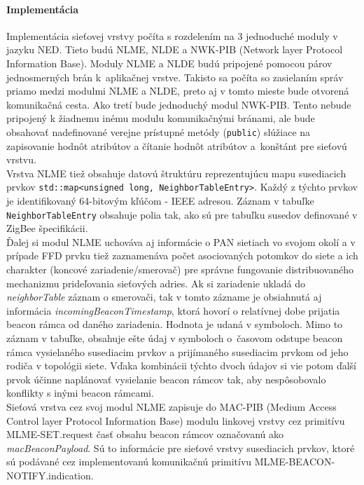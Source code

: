 \paragraph{Implementácia}
Implementácia sieťovej vrstvy počíta s rozdelením na 3 jednoduché moduly v jazyku NED. Tieto budú NLME, NLDE a NWK-PIB (Network layer Protocol Information Base). Moduly NLME a NLDE budú pripojené pomocou párov jednosmerných brán k~aplikačnej vrstve. Takisto sa počíta so zasielaním správ priamo medzi modulmi NLME a NLDE, preto aj v tomto mieste bude otvorená komunikačná cesta. Ako tretí bude jednoduchý modul NWK-PIB. Tento nebude pripojený k žiadnemu inému modulu komunikačnými bránami, ale bude obsahovať nadefinované verejne prístupné metódy (\texttt{public}) slúžiace na zapisovanie hodnôt atribútov a čítanie hodnôt atribútov a~konštánt pre sieťovú vrstvu.\\
\indent Vrstva NLME tiež obsahuje datovú štruktúru reprezentujúcu mapu susediacich prvkov \texttt{std::map<unsigned long, NeighborTableEntry>}. Každý z týchto prvkov je identifikovaný 64-bitovým kľúčom - IEEE adresou. Záznam v tabuľke \texttt{NeighborTableEntry} obsahuje polia tak, ako sú pre tabuľku susedov definované v ZigBee špecifikácii.\\
\indent Ďalej si modul NLME uchováva aj informácie o PAN sietiach vo svojom okolí a v prípade FFD prvku tiež zaznamenáva počet asociovaných potomkov do siete a ich charakter (koncové zariadenie/smerovač) pre správne fungovanie distribuovaného mechanizmu prideľovania sieťových adries. Ak si zariadenie ukladá do \textit{neighborTable} záznam o smerovači, tak v tomto zázname je obsiahnutá aj informácia \textit{incomingBeaconTimestamp}, ktorá hovorí o relatívnej dobe prijatia beacon rámca od daného zariadenia. Hodnota je udaná v symboloch. Mimo to záznam v tabuľke, obsahuje ešte údaj v symboloch o~časovom odstupe beacon rámca vysielaného susediacim prvkov a prijímaného susediacim prvkom od jeho rodiča v topológii siete. Vďaka kombinácii týchto dvoch údajov si vie potom ďalší prvok účinne naplánovať vysielanie beacon rámcov tak, aby nespôsobovalo konflikty s inými beacon rámcami.\\
\indent Sieťová vrstva cez svoj modul NLME zapisuje do MAC-PIB (Medium Access Control layer Protocol Information Base) modulu linkovej vrstvy cez primitívu MLME-SET.request časť obsahu beacon rámcov označovanú ako \textit{macBeaconPayload}. Sú to informácie pre sieťové vrstvy susediacich prvkov, ktoré sú podávané cez implementovanú komunikačnú primitívu MLME-BEACON-NOTIFY.indication.\\
